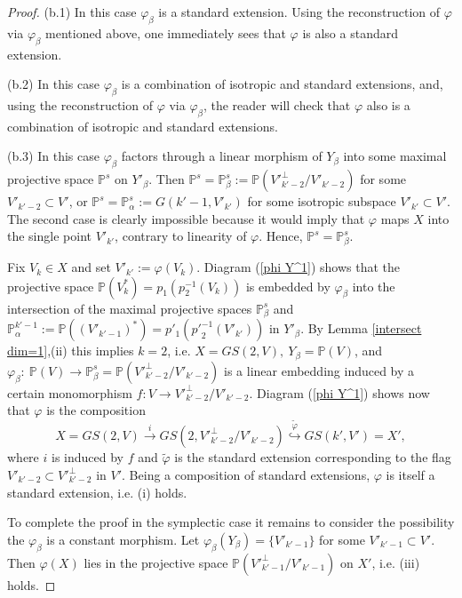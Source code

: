 \documentclass[12pt]{amsart}
\renewcommand{\phi}{\varphi}
\theoremstyle{definition}
\begin{document}
\begin{proof}
(b.1) In this case $\phi_{\beta}$ is a standard extension.
Using the reconstruction of $\phi$ via $\phi_{\beta}$ mentioned above, one immediately sees that $\phi$ is also a
standard extension.

(b.2) In this case $\phi_{\beta}$ is a combination of isotropic and standard extensions, and, using the reconstruction
of $\phi$ via $\phi_{\beta}$, the reader will check that $\phi$ also is a combination of isotropic and standard
extensions.


(b.3) In this case $\phi_{\beta}$ factors through a linear morphism of $Y_{\beta}$ into some maximal projective space
$\mathbb{P}^s$ on $Y'_\beta$.
Then $\mathbb{P}^s=\mathbb{P}^s_\beta:=\mathbb{P}({V'}_{k'-2}^\bot/V'_{k'-2})$ for some $V'_{k'-2}\subset V'$, or
$\mathbb{P}^s=\mathbb{P}^s_{\alpha}:=G(k'-1,V'_{k'})$ for some isotropic subspace $V'_{k'}\subset V'$.
The second case is clearly impossible because it would imply that
$\phi$ maps $X$ into the single point $V'_{k'}$, contrary to linearity of $\phi$. Hence,
$\mathbb{P}^s=\mathbb{P}^s_{\beta}$.

Fix $V_k\in X$ and set $V'_{k'}:=\phi(V_k).$ Diagram (\ref{phi Y^1}) shows that the projective
space $\mathbb{P}(V_k^*)=p_1(p_2^{-1}(V_k))$ is embedded by $\phi_{\beta}$ into the
intersection of the maximal projective spaces $\mathbb{P}^s_{\beta}$ and
$\mathbb{P}^{k'-1}_{\alpha}:=\mathbb{P}((V'_{k'-1})^*)=p'_1({p'}_2^{-1}(V'_{k'}))$ in $Y'_{\beta}$.
By Lemma \ref{intersect dim=1},(ii) this implies $k=2$,
i.e. $X=GS(2,V),\ Y_{\beta}=\mathbb{P}(V)$, and
$\phi_{\beta}:\ \mathbb{P}(V)\to\mathbb{P}^s_{\beta}=\mathbb{P}({V'}_{k'-2}^\bot/V'_{k'-2})$ is a linear embedding
induced by a certain monomorphism $f:V\to{V'}_{k'-2}^\bot/V'_{k'-2}$.
Diagram (\ref{phi Y^1}) shows now that $\phi$ is the composition
$$
X=GS(2,V)\overset{i}\to GS(2,{V'}_{k'-2}^\bot/V'_{k'-2})\overset{\tilde{\phi}}\hookrightarrow GS(k',V')=X',
$$
where $i$ is induced by $f$ and $\tilde{\phi}$ is the standard extension corresponding to the flag
${V'}_{k'-2}\subset{V'}_{k'-2}^\bot$ in $V'$. Being a composition of standard extensions, $\phi$ is itself a standard
extension, i.e. (i) holds.

To complete the proof in the symplectic case it remains to consider the possibility the $\phi_{\beta}$
is a constant morphism. Let $\phi_{\beta}(Y_{\beta})=\{V'_{k'-1}\}$ for some $V'_{k'-1}\subset V'$.
Then $\phi(X)$ lies in the projective space $\mathbb{P}({V'}_{k'-1}^\bot/V'_{k'-1})$ on $X'$, i.e. (iii) holds.


\end{proof}
\end{document}
